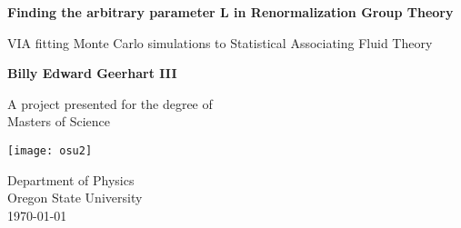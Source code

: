 \begin{titlepage}
	\begin{center}
	\vspace*{1cm}
	
	\Huge
	\textbf{Finding the arbitrary parameter L in Renormalization Group Theory}
	
	\vspace{0.5cm}
	\LARGE
	 VIA fitting Monte Carlo simulations to Statistical Associating Fluid Theory
	
	\vspace{1.5cm}
	
	\textbf{Billy Edward Geerhart III}
	
	\vfill
	
	A project presented for the degree of\\
	Masters of Science
	
	\vspace{0.8cm}
	
	\texttt{[image: osu2]}
	
	\Large
	Department of Physics\\
	Oregon State University\\
	\today
	
	\end{center}
\end{titlepage}